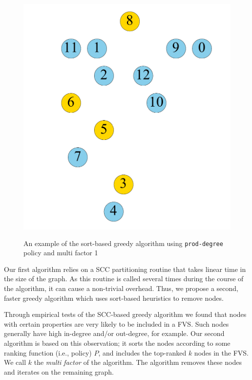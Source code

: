 \begin{figure}[t]
\begin{minipage}[b]{0.19\linewidth}
            {\includegraphics[width=\textwidth]{./alg_fig/simple-g8}}
   		\end{minipage}
  	\vspace{-1em}             
   \caption{An example of the sort-based greedy algorithm using \texttt{prod-degree} policy and multi factor 1}
   \label{fig:simple}               
   \vspace{-1em}    	
\end{figure}

Our first algorithm relies on a SCC partitioning routine that takes linear time in the size of the graph. As this routine is called several times during the course of the algorithm, it can cause a non-trivial overhead. Thus, we propose a second, faster greedy algorithm which uses sort-based heuristics to remove nodes.

Through empirical tests of the SCC-based greedy algorithm we found that nodes with certain properties are very likely to be included in a FVS. Such nodes generally have high in-degree and/or out-degree, for example. Our second algorithm is based on this observation; it sorts the nodes according to some ranking function (i.e., policy) $P$, and includes the top-ranked $k$ nodes in the FVS. We call $k$ the \emph{multi factor} of the algorithm. The algorithm removes these nodes and iterates on the remaining graph.

